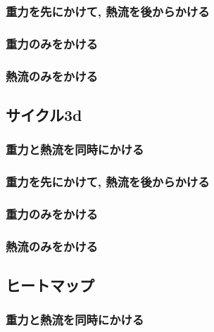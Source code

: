 

\subsubsection{重力を先にかけて, 熱流を後からかける}



\subsubsection{重力のみをかける}



\subsubsection{熱流のみをかける}


\subsection{サイクル3d}

\subsubsection{重力と熱流を同時にかける}



\subsubsection{重力を先にかけて, 熱流を後からかける}



\subsubsection{重力のみをかける}



\subsubsection{熱流のみをかける}


\subsection{ヒートマップ}

\subsubsection{重力と熱流を同時にかける}

